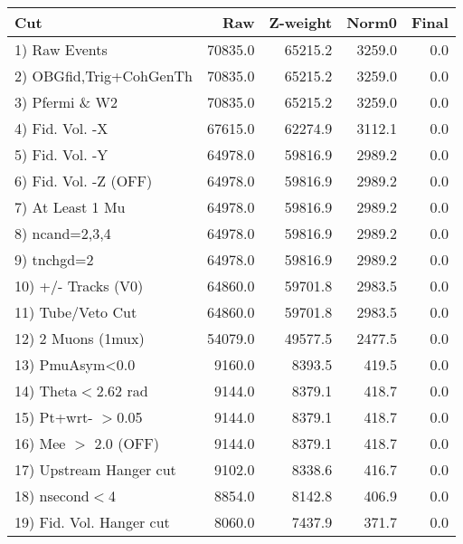  \begin{table}[h!]\centering
 \begin{tabular}{||l||r|r|r|r||}
 \hline
 \hline
 Cut & Raw & Z-weight & Norm0 & Final \\
 \hline
  1) Raw Events           &     70835.0 &     65215.2 &      3259.0 &         0.0 \\
  2) OBGfid,Trig+CohGenTh &     70835.0 &     65215.2 &      3259.0 &         0.0 \\
  3) Pfermi \& W2         &     70835.0 &     65215.2 &      3259.0 &         0.0 \\
  4) Fid. Vol. -X         &     67615.0 &     62274.9 &      3112.1 &         0.0 \\
  5) Fid. Vol. -Y         &     64978.0 &     59816.9 &      2989.2 &         0.0 \\
  6) Fid. Vol. -Z (OFF)   &     64978.0 &     59816.9 &      2989.2 &         0.0 \\
  7) At Least 1 Mu        &     64978.0 &     59816.9 &      2989.2 &         0.0 \\
  8) ncand=2,3,4          &     64978.0 &     59816.9 &      2989.2 &         0.0 \\
  9) tnchgd=2             &     64978.0 &     59816.9 &      2989.2 &         0.0 \\
 10) +/- Tracks (V0)      &     64860.0 &     59701.8 &      2983.5 &         0.0 \\
 11) Tube/Veto Cut        &     64860.0 &     59701.8 &      2983.5 &         0.0 \\
 12) 2 Muons (1mux)       &     54079.0 &     49577.5 &      2477.5 &         0.0 \\
 13) PmuAsym<0.0          &      9160.0 &      8393.5 &       419.5 &         0.0 \\
 14) Theta$<$2.62 rad     &      9144.0 &      8379.1 &       418.7 &         0.0 \\
 15) Pt+wrt- $>$0.05      &      9144.0 &      8379.1 &       418.7 &         0.0 \\
 16) Mee $>$ 2.0  (OFF)   &      9144.0 &      8379.1 &       418.7 &         0.0 \\
 17) Upstream Hanger cut  &      9102.0 &      8338.6 &       416.7 &         0.0 \\
 18) nsecond$<$4          &      8854.0 &      8142.8 &       406.9 &         0.0 \\
 19) Fid. Vol. Hanger cut &      8060.0 &      7437.9 &       371.7 &         0.0 \\

\end{tabular}
\end{table}
